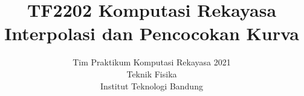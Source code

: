 \documentclass[a4paper,11pt,bahasa]{article} %
\begin{document}
\title{%
{\small TF2202 Komputasi Rekayasa}\\
Interpolasi dan Pencocokan Kurva
}
\author{Tim Praktikum Komputasi Rekayasa 2021\\
Teknik Fisika\\
Institut Teknologi Bandung}
\date{}
\maketitle














\end{document}

